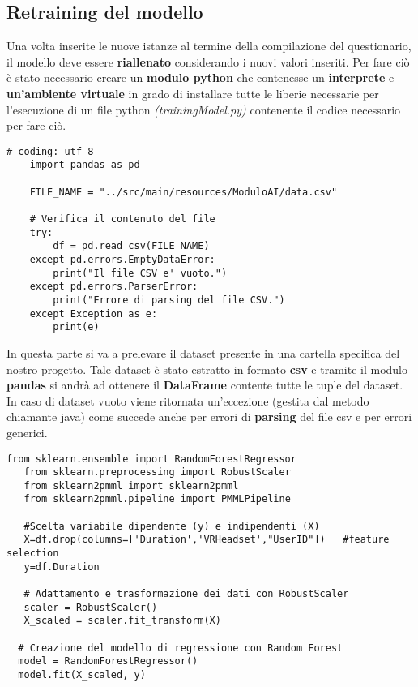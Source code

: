 \subsection{Retraining del modello}
\fancyhead{}    %

Una volta inserite le nuove istanze al termine della compilazione del questionario, il modello deve essere \textbf{riallenato} considerando i nuovi valori inseriti.\vspace{1ex}
Per fare ciò è stato necessario creare un \textbf{modulo python} che contenesse un \textbf{interprete} e \textbf{un'ambiente virtuale} in grado di installare tutte le liberie necessarie per l'esecuzione di un file python \textcolor{gray!50!black}{\textit{(trainingModel.py)}} contenente il codice necessario per fare ciò. \\ 

\begin{lstlisting}[caption=Prelievo del dataset]
    # coding: utf-8
    import pandas as pd
    
    FILE_NAME = "../src/main/resources/ModuloAI/data.csv"
    
    # Verifica il contenuto del file
    try:
        df = pd.read_csv(FILE_NAME)
    except pd.errors.EmptyDataError:
        print("Il file CSV e' vuoto.")
    except pd.errors.ParserError:
        print("Errore di parsing del file CSV.")
    except Exception as e:
        print(e)
\end{lstlisting} 

In questa parte si va a prelevare il dataset presente in una cartella specifica del nostro progetto.
Tale dataset è stato estratto in formato \textbf{csv} e tramite il modulo \textbf{pandas} si andrà ad ottenere il \textbf{DataFrame} contente tutte le tuple del dataset.\vspace{1ex}\\
In caso di dataset vuoto viene ritornata un'eccezione (gestita dal metodo chiamante java) come succede anche per errori di \textbf{parsing} del file csv e per errori generici. \\

\begin{lstlisting}[caption=Feature preparation]
   from sklearn.ensemble import RandomForestRegressor
   from sklearn.preprocessing import RobustScaler
   from sklearn2pmml import sklearn2pmml
   from sklearn2pmml.pipeline import PMMLPipeline

   #Scelta variabile dipendente (y) e indipendenti (X)
   X=df.drop(columns=['Duration','VRHeadset',"UserID"])   #feature selection
   y=df.Duration

   # Adattamento e trasformazione dei dati con RobustScaler
   scaler = RobustScaler()
   X_scaled = scaler.fit_transform(X)

  # Creazione del modello di regressione con Random Forest
  model = RandomForestRegressor()
  model.fit(X_scaled, y)
\end{lstlisting} 

